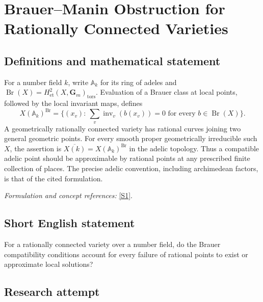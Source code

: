 \documentclass[11pt]{article}
\newcommand{\A}{\mathbb{A}}
\newcommand{\sref}[2]{\hyperlink{source:#1:#2}{[S#2]}}
\newif\ifshowcatalogue
\newcommand{\cataloguescope}[1]{\ifshowcatalogue
 \paragraph{Exact scope in the supplied catalogue.}
 \begin{quote}\small #1\end{quote}\fi}
\begin{document}
\setcounter{section}{0}
\clearpage
\section*{\texorpdfstring{Brauer–Manin Obstruction for Rationally Connected Varieties}{Brauer–Manin Obstruction for Rationally Connected Varieties}}\label{statement}
\subsection{Definitions and mathematical statement}
For a number field $k$, write $\A_k$ for its ring of adeles and $\operatorname{Br}(X)=H^2_{\mathrm{et}}(X,\mathbf G_m)_{\mathrm{tors}}$. Evaluation of a Brauer class at local points, followed by the local invariant maps, defines
\[
 X(\A_k)^{\operatorname{Br}}=\{(x_v):\ \sum_v\operatorname{inv}_v(b(x_v))=0\text{ for every }b\in\operatorname{Br}(X)\}.
\]
A geometrically rationally connected variety has rational curves joining two general geometric points. For every smooth proper geometrically irreducible such $X$, the assertion is
$\overline{X(k)}=X(\A_k)^{\operatorname{Br}}$ in the adelic topology. Thus a compatible adelic point should be approximable by rational points at any prescribed finite collection of places. The precise adelic convention, including archimedean factors, is that of the cited formulation.
\par\smallskip\textit{Formulation and concept references:} \sref{statement}{1}.
\cataloguescope{Let X be a smooth, proper, geometrically irreducible variety over a number field k whose base change to an algebraic closure is rationally connected. Prove that X(k) is dense in the Brauer-Manin set X(A\_k)\textasciicircum{}\{Br(X)\}; in particular the Brauer-Manin obstruction is the only obstruction to the Hasse principle and weak approximation for such varieties.}
\subsection{Short English statement}
For a rationally connected variety over a number field, do the Brauer compatibility conditions account for every failure of rational points to exist or approximate local solutions?
\subsection{Research attempt}
\end{document}
